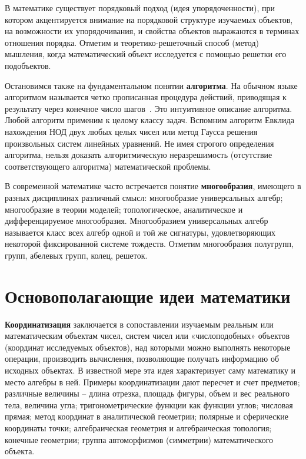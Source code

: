 В математике существует порядковый подход (идея упорядоченности), при котором акцентируется внимание на порядковой структуре изучаемых объектов, на возможности их упорядочивания, и свойства объектов выражаются в терминах отношения порядка. Отметим и теоретико-решеточный способ (метод) мышления, когда математический объект исследуется с помощью решетки его подобъектов.

Остановимся также на фундаментальном понятии \textbf{алгоритма}. На обычном языке алгоритмом называется четко прописанная процедура действий, приводящая к результату через конечное число шагов~\cite{дьяченко1972основные}. Это интуитивное описание алгоритма. Любой алгоритм применим к целому классу задач. Вспомним алгоритм Евклида нахождения НОД двух любых целых чисел или метод Гаусса решения произвольных систем линейных уравнений. Не имея строгого определения алгоритма, нельзя доказать алгоритмическую неразрешимость (отсутствие соответствующего алгоритма) математической проблемы. 

В современной математике часто встречается понятие \textbf{многообразия}, имеющего в разных дисциплинах различный смысл: многообразие универсальных алгебр; многообразие в теории моделей; топологическое, аналитическое и дифференцируемое многообразия. Многообразием универсальных алгебр называется класс всех алгебр одной и той же сигнатуры, удовлетворяющих некоторой фиксированной системе тождеств. Отметим многообразия полугрупп, групп, абелевых групп, колец, решеток.

\section{Основополагающие идеи математики}

\textbf{Координатизация} заключается в сопоставлении изучаемым реальным или математическим объектам чисел, систем чисел или «числоподобных» объектов (координат исследуемых объектов), над которыми можно выполнять некоторые операции, производить вычисления, позволяющие получать информацию об исходных объектах. В известной мере эта идея характеризует саму математику и место алгебры в ней. Примеры координатизации дают пересчет и счет предметов; различные величины – длина отрезка, площадь фигуры, объем и вес реального тела, величина угла; тригонометрические функции как функции углов; числовая прямая; метод координат в аналитической геометрии; полярные и сферические координаты точки; алгебраическая геометрия и алгебраическая топология; конечные геометрии; группа автоморфизмов (симметрии) математического объекта.

